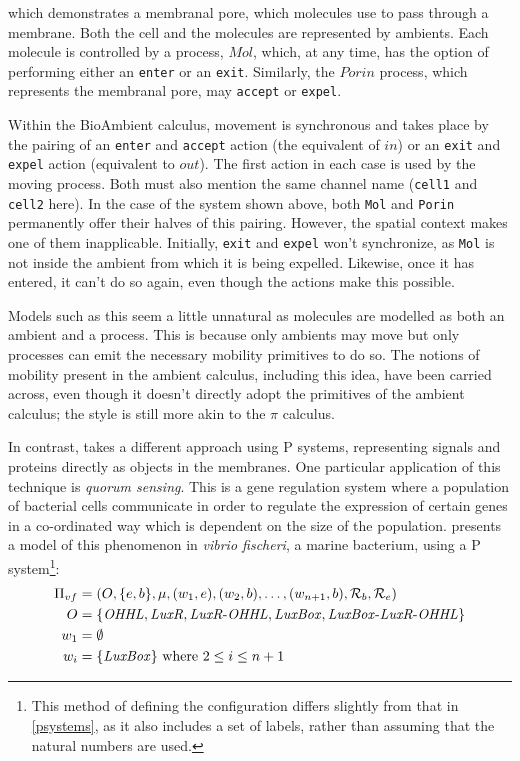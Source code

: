 \noindent which demonstrates a membranal pore, which molecules use to
pass through a membrane.  Both the cell and the molecules are
represented by ambients.  Each molecule is controlled by a process,
$Mol$, which, at any time, has the option of performing either an
\texttt{enter} or an \texttt{exit}.  Similarly, the $Porin$ process,
which represents the membranal pore, may \texttt{accept} or
\texttt{expel}.

Within the BioAmbient calculus, movement is synchronous and takes place
by the pairing of an \texttt{enter} and \texttt{accept} action (the
equivalent of $in$) or an \texttt{exit} and \texttt{expel} action
(equivalent to $out$).  The first action in each case is used by the
moving process.  Both must also mention the same channel name
(\texttt{cell1} and \texttt{cell2} here).  In the case of the system
shown above, both \texttt{Mol} and \texttt{Porin} permanently offer
their halves of this pairing.  However, the spatial context makes one of
them inapplicable.  Initially, \texttt{exit} and \texttt{expel} won't
synchronize, as \texttt{Mol} is not inside the ambient from which it is
being expelled.  Likewise, once it has entered, it can't do so again,
even though the actions make this possible.

Models such as this seem a little unnatural as molecules are modelled as
both an ambient and a process.  This is because only ambients may move
but only processes can emit the necessary mobility primitives to do so.
The notions of mobility present in the ambient calculus, including this
idea, have been carried across, even though it doesn't directly adopt
the primitives of the ambient calculus; the style is still more akin to
the $\pi$ calculus.

In contrast, \cite{fran} takes a different approach using P systems,
representing signals and proteins directly as objects in the membranes.
One particular application of this technique is \emph{quorum sensing}.
This is a gene regulation system where a population of bacterial cells
communicate in order to regulate the expression of certain genes in a
co-ordinated way which is dependent on the size of the population.
\cite{fran} presents a model of this phenomenon in \emph{vibrio
fischeri}, a marine bacterium, using a P system\footnote{This method of
defining the configuration differs slightly from that in \ref{psystems},
as it also includes a set of labels, rather than assuming that the
natural numbers are used.}:
\begin{align*}
  \Pi_{vf} & = (O, \{e,b\}, \mu, (w_1, e), (w_2, b), \dots,
  (w_{n+1},b),\mathcal{R}_b, \mathcal{R}_e) \\
  O & = \{\mathit{OHHL}, \mathit{LuxR}, \mathit{LuxR}\text{-}\mathit{OHHL}, \mathit{LuxBox}, \mathit{LuxBox}\text{-}\mathit{LuxR}\text{-}\mathit{OHHL}\} \\
  w_1 & = \emptyset \\
  w_i & = \{\mathit{LuxBox}\}\ \text{where}\ 2 \le i \le n + 1 \\
\end{align*}

